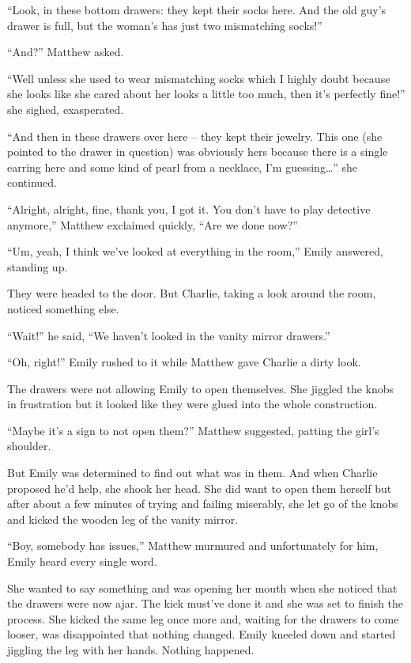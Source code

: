 “Look, in these bottom drawers: they kept their socks here. And the old guy’s drawer is full, but the woman’s has just two mismatching socks!”

“And?” Matthew asked.

“Well unless she used to wear mismatching socks which I highly doubt because she looks like she cared about her looks a little too much, then it’s perfectly fine!” she sighed, exasperated.

“And then in these drawers over here – they kept their jewelry. This one (she pointed to the drawer in question) was obviously hers because there is a single earring here and some kind of pearl from a necklace, I’m guessing…” she continued.

“Alright, alright, fine, thank you, I got it. You don’t have to play detective anymore,” Matthew exclaimed quickly, “Are we done now?”

“Um, yeah, I think we’ve looked at everything in the room,” Emily answered, standing up.

They were headed to the door. But Charlie, taking a look around the room, noticed something else.

“Wait!” he said, “We haven’t looked in the vanity mirror drawers.”

“Oh, right!” Emily rushed to it while Matthew gave Charlie a dirty look.

The drawers were not allowing Emily to open themselves. She jiggled the knobs in frustration but it looked like they were glued into the whole construction.

“Maybe it’s a sign to not open them?” Matthew suggested, patting the girl’s shoulder.

But Emily was determined to find out what was in them. And when Charlie proposed he’d help, she shook her head. She did want to open them herself but after about a few minutes of trying and failing miserably, she let go of the knobs and kicked the wooden leg of the vanity mirror.

“Boy, somebody has issues,” Matthew murmured and unfortunately for him, Emily heard every single word.

She wanted to say something and was opening her mouth when she noticed that the drawers were now ajar. The kick must’ve done it and she was set to finish the process. She kicked the same leg once more and, waiting for the drawers to come looser, was disappointed that nothing changed. Emily kneeled down and started jiggling the leg with her hands. Nothing happened.

